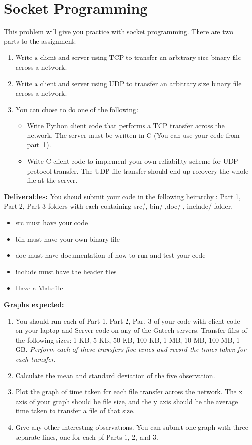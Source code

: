 \documentclass[11pt]{article}
\begin{document}
\section{Socket Programming}

This problem will give you practice with socket programming.  There are
two parts to the assignment: 
\begin{enumerate}
\itemsep=-1pt
\item Write a client and server using TCP to transfer an arbitrary size
  binary file across a network.
\item Write a client and server using UDP to transfer an arbitrary size
  binary file across a network.
\item You can chose to do one of the following:
\begin{itemize}
\itemsep=-1pt
 \item Write Python client code that performs a TCP transfer across the
   network.  The server must be written in C (You can use your code from
   part~1).
\item Write C client code to implement your own reliability scheme for
  UDP protocol transfer. The UDP file transfer should end up
  recovery the whole file at the server. 
\end{itemize}
\end{enumerate}

{\bf Deliverables:}
You shoud submit your code in the following heirarchy :
Part 1, Part 2, Part 3 folders with each containing src/, bin/ ,doc/ ,
include/ folder.
\begin{itemize}
\itemsep=-1pt
\item src must have your code
\item bin must have your own binary file
\item doc must have documentation of how to run and test your code
\item include must have the header files
\item Have a Makefile
\end{itemize}

{\bf Graphs expected:}
\begin{enumerate}
\itemsep=-1pt
\item You should run each of Part 1, Part 2, Part 3 of your code
  with client code on your laptop and Server code on any of the Gatech
  servers.  Transfer files of the following sizes: 1 KB, 5 KB, 50 KB,
  100 KB, 1 MB, 10 MB, 100 MB, 1 GB.  {\em Perform each of these
    transfers five times and record the times taken for each transfer.}
\item Calculate the mean and standard deviation of the five observation.
\item Plot the graph of time taken for each file transfer across the
  network.  The x axis of your graph should be file size, and the y axis
  should be the average time taken to transfer a file of that size.
\item Give any other interesting observations.  You can submit one graph
  with three separate lines, one for each pf Parts 1, 2, and 3.
\end{enumerate}
\end{document}
